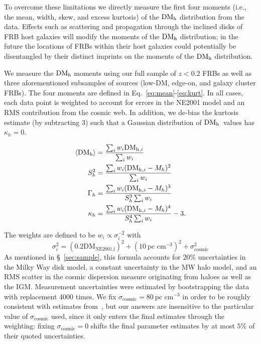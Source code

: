\documentclass[twocolumn]{aastex631}
\newcommand{\dmh}{\ensuremath{{\rm DM}_\textrm{h}}}
\begin{document}
To overcome these limitations we directly measure the first four moments (i.e., the mean, width, skew, and excess kurtosis) of the $\dmh$ distribution from the data. Effects such as scattering and propagation through the inclined disks of FRB host galaxies will modify the moments of the $\dmh$ distribution; in the future the locations of FRBs within their host galaxies could potentially be disentangled by their distinct imprints on the moments of the $\dmh$ distribution.

We measure the $\dmh$ moments using our full sample of $z < 0.2$ FRBs as well as three aforementioned subsamples of sources (low-DM, edge-on, and galaxy cluster FRBs). The four moments are defined in Eq.~\ref{eq:mean}-\ref{eq:kurt}. In all cases, each data point is weighted to account for errors in the NE2001 model and an RMS contribution from the cosmic web. In addition, we de-bias the kurtosis estimate (by subtracting 3) such that a Gaussian distribution of \dmh\ values has $\kappa_h = 0$. %


\begin{align} 
\langle \dmh\rangle &= \dfrac{\sum_i w_i \dmh{}_{,i}}{\sum_i w_i} \label{eq:mean}\\
S_h^2 &= \dfrac{\sum_i w_i (\dmh{}_{,i} - M_h)^2}{\sum_i w_i}\label{eq:std} \\
\Gamma_h &= \dfrac{\sum_i w_i (\dmh{}_{,i} - M_h)^3}{S_h^{3}\sum_i w_i} \label{eq:skew}\\
\kappa_h &= \dfrac{\sum_i w_i (\dmh{}_{,i} - M_h)^4}{S_h^{4}\sum_i w_i} - 3.\label{eq:kurt}
\end{align}

The weights are defined to be $w_i \propto \sigma_i^{-2}$ with
\begin{equation} 
\sigma_i^2 = (0.2\text{DM}_\textrm{NE2001,i})^2 + (10~\text{pc cm}^{-3})^2 + \sigma_\textrm{cosmic}^{2}\label{eq:err_budget}
\end{equation} 
As mentioned in \S~\ref{sec:sample}, this formula accounts for 20\% uncertainties in the Milky Way disk model, a constant uncertainty in the MW halo model, and an RMS scatter in the cosmic dispersion measure originating from haloes as well as the IGM. Measurement uncertainties were estimated by bootstrapping the data with replacement 4000 times. We fix $\sigma_\textrm{cosmic} = 80~\text{pc cm}^{-3}$ in order to be roughly consistent with estimates from~\citet{walker2024dispersion}, but our answers are insensitive to the particular value of $\sigma_\textrm{cosmic}$ used, since it only enters the final estimates through the weighting: fixing $\sigma_\textrm{cosmic} = 0$ shifts the final parameter estimates by at most $5\%$ of their quoted uncertainties. 
\end{document}

